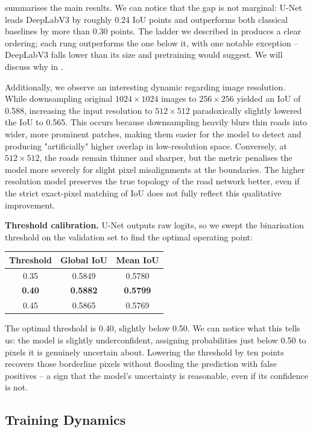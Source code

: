 \documentclass[conference]{IEEEtran}
\begin{document}
 summarises the main results.
We can notice that the gap is not marginal: U-Net leads DeepLabV3 by roughly 0.24 IoU points
and outperforms both classical baselines by more than 0.30 points.
The ladder we described in  produces a clear ordering; each rung outperforms
the one below it, with one notable exception -- DeepLabV3 falls lower than its size and
pretraining would suggest.
We will discuss why in .

Additionally, we observe an interesting dynamic regarding image resolution. 
While downsampling original $1024\times1024$ images to $256\times256$ yielded an IoU of 0.588, increasing the input resolution to $512\times512$ paradoxically slightly lowered the IoU to 0.565. 
This occurs because downsampling heavily blurs thin roads into wider, more prominent patches, making them easier for the model to detect and producing "artificially" higher overlap in low-resolution space. Conversely, at $512\times512$, the roads remain thinner and sharper, but the metric penalises the model more severely for slight pixel misalignments at the boundaries. The higher resolution model preserves the true topology of the road network better, even if the strict exact-pixel matching of IoU does not fully reflect this qualitative improvement.

\textbf{Threshold calibration.}
U-Net outputs raw logits, so we swept the binarisation threshold on the validation set to
find the optimal operating point:
\begin{center}
\begin{tabular}{ccc}
  \toprule
  Threshold & Global IoU & Mean IoU \\
  \midrule
  0.35 & 0.5849 & 0.5780 \\
  \textbf{0.40} & \textbf{0.5882} & \textbf{0.5799} \\
  0.45 & 0.5865 & 0.5769 \\
  \bottomrule
\end{tabular}
\end{center}
The optimal threshold is 0.40, slightly below 0.50.
We can notice what this tells us: the model is slightly underconfident, assigning probabilities
just below 0.50 to pixels it is genuinely uncertain about.
Lowering the threshold by ten points recovers those borderline pixels without flooding the
prediction with false positives -- a sign that the model's uncertainty is reasonable,
even if its confidence is not.

\subsection{Training Dynamics}
\end{document}
